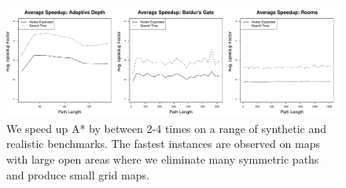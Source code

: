 \vspace{1em}
\begin{figure}[h]
\label{fig:speedup}
\begin{center}
\includegraphics[width=\columnwidth]{diagrams/speedup}
\caption{We speed up A* by between 2-4 times on a range of synthetic
and realistic benchmarks.
The fastest instances are observed on maps with large open areas where we
eliminate many symmetric paths and produce small grid maps.}
\end{center}
\end{figure}

